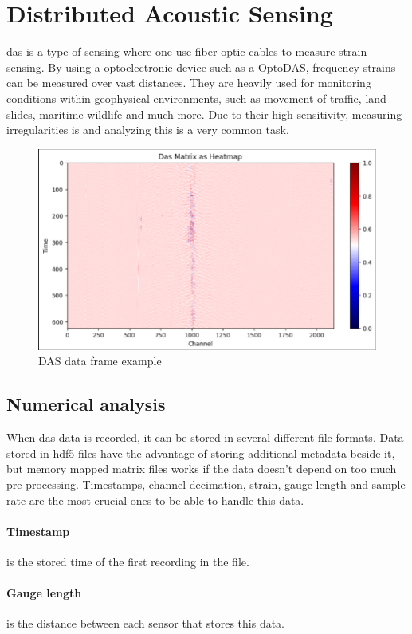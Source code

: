 \section{Distributed Acoustic Sensing}
\label{back:das}

\acrfull{das} is a type of sensing where one use fiber optic cables to measure strain sensing. By using a optoelectronic device such as a OptoDAS, frequency strains can be measured over vast distances. They are heavily used for monitoring conditions within geophysical environments, such as movement of traffic, land slides, maritime wildlife and much more. Due to their high sensitivity, measuring irregularities is and analyzing this is a very common task. 

\begin{figure}[h]
    \centering
    \includegraphics[width=0.7\linewidth]{figures/das_example.png}
    \caption{DAS data frame example}
    \label{fig:dasframe-ex}
\end{figure}

\subsection{Numerical analysis}

When \acrshort{das} data is recorded, it can be stored in several different file formats. Data stored in \acrshort{hdf5} files have the advantage of storing additional metadata beside it, but memory mapped matrix files works if the data doesn't depend on too much pre processing. Timestamps, channel decimation, strain, gauge length and sample rate are the most crucial ones to be able to handle this data. 

\paragraph{Timestamp} is the stored time of the first recording in the file.

\paragraph{Gauge length} is the distance between each sensor that stores this data.

